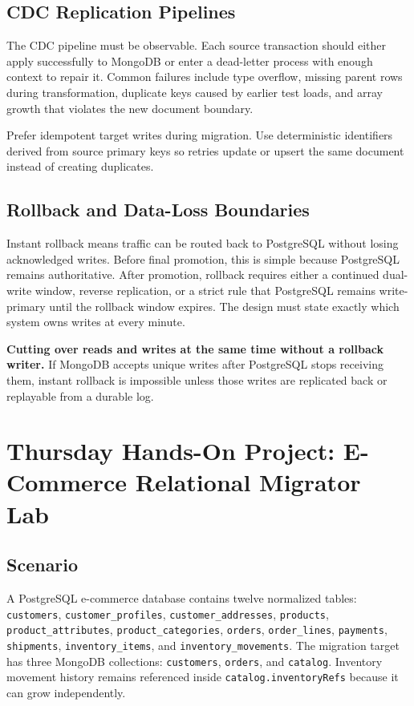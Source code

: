 \subsection{CDC Replication Pipelines}
The CDC pipeline must be observable. Each source transaction should either apply successfully to MongoDB or enter a dead-letter process with enough context to repair it. Common failures include type overflow, missing parent rows during transformation, duplicate keys caused by earlier test loads, and array growth that violates the new document boundary.

\begin{tipbox}
Prefer idempotent target writes during migration. Use deterministic identifiers derived from source primary keys so retries update or upsert the same document instead of creating duplicates.
\end{tipbox}

\subsection{Rollback and Data-Loss Boundaries}
Instant rollback means traffic can be routed back to PostgreSQL without losing acknowledged writes. Before final promotion, this is simple because PostgreSQL remains authoritative. After promotion, rollback requires either a continued dual-write window, reverse replication, or a strict rule that PostgreSQL remains write-primary until the rollback window expires. The design must state exactly which system owns writes at every minute.

\begin{pitfall}
\textbf{Cutting over reads and writes at the same time without a rollback writer.} If MongoDB accepts unique writes after PostgreSQL stops receiving them, instant rollback is impossible unless those writes are replicated back or replayable from a durable log.
\end{pitfall}

\section{Thursday Hands-On Project: E-Commerce Relational Migrator Lab}
\subsection{Scenario}
A PostgreSQL e-commerce database contains twelve normalized tables: \texttt{customers}, \texttt{customer\_profiles}, \texttt{customer\_addresses}, \texttt{products}, \texttt{product\_attributes}, \texttt{product\_categories}, \texttt{orders}, \texttt{order\_lines}, \texttt{payments}, \texttt{shipments}, \texttt{inventory\_items}, and \texttt{inventory\_movements}. The migration target has three MongoDB collections: \texttt{customers}, \texttt{orders}, and \texttt{catalog}. Inventory movement history remains referenced inside \texttt{catalog.inventoryRefs} because it can grow independently.

